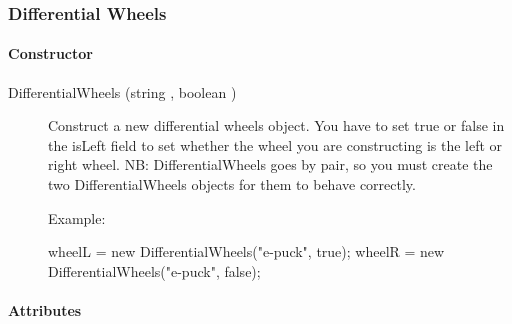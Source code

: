 \subsubsection{Differential Wheels}

\paragraph{Constructor}

\noindent
\begin{description}
\item[{DifferentialWheels (string , boolean )}]
  Construct a new differential wheels object. You have to set true or
  false in the isLeft field to set whether the wheel you are
  constructing is the left or right wheel.  NB: DifferentialWheels
  goes by pair, so you must create the two DifferentialWheels objects
  for them to behave correctly.

  Example:

\begin{urbiunchecked}
wheelL = new DifferentialWheels("e-puck", true);
wheelR = new DifferentialWheels("e-puck", false);
\end{urbiunchecked}
\end{description}

\paragraph{Attributes}

